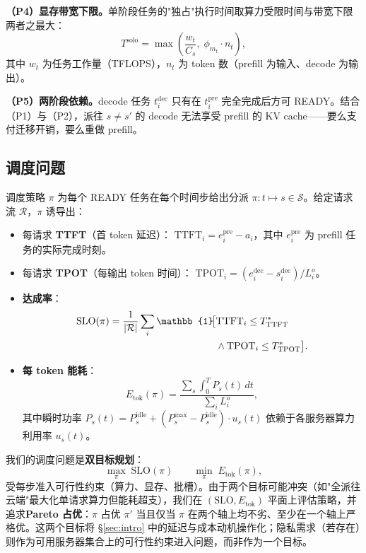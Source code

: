 \textbf{（P4）显存带宽下限。}单阶段任务的"独占"执行时间取算力受限时间与带宽下限两者之最大：
\begin{equation}
  T^{\text{solo}}
    = \max\!\left(\frac{w_t}{C_s},\;
                  \phi_{m_t} \cdot n_t\right),
\end{equation}
其中 $w_t$ 为任务工作量（TFLOPS），$n_t$ 为 token 数（prefill 为输入、decode 为输出）。

\textbf{（P5）两阶段依赖。}decode 任务 $t^{\text{dec}}_i$ 只有在 $t^{\text{pre}}_i$ 完全完成后方可 READY。结合（P1）与（P2），派往 $s \neq s'$ 的 decode 无法享受 prefill 的 KV cache——要么支付迁移开销，要么重做 prefill。

\subsection{调度问题}
\label{sec:sched-problem}

调度策略 $\pi$ 为每个 READY 任务在每个时间步给出分派 $\pi: t \mapsto s \in \mathcal{S}$。给定请求流 $\mathcal{R}$，$\pi$ 诱导出：

\begin{itemize}
\item 每请求 \textbf{TTFT}（首 token 延迟）：
  $\text{TTFT}_i = e^{\text{pre}}_i - a_i$，其中
  $e^{\text{pre}}_i$ 为 prefill 任务的实际完成时刻。

\item 每请求 \textbf{TPOT}（每输出 token 时间）：
  $\text{TPOT}_i = (e^{\text{dec}}_i - s^{\text{dec}}_i) / L^o_i$。

\item \textbf{\slo{} 达成率}：
  \begin{align}
    \text{SLO}(\pi) = \frac{1}{|\mathcal{R}|} \sum_i
      \mathbb{1}\!\bigl[&\text{TTFT}_i \le T^*_{\text{TTFT}}
      \notag\\
      &\land \text{TPOT}_i \le T^*_{\text{TPOT}}\bigr].
  \end{align}

\item \textbf{每 token 能耗}：
  \begin{equation}
    E_{\text{tok}}(\pi) =
      \frac{\sum_s \int_0^T P_s(t)\,dt}{\sum_i L^o_i},
  \end{equation}
  其中瞬时功率
  $P_s(t) = P^{\text{idle}}_s + (P^{\max}_s - P^{\text{idle}}_s)
  \cdot u_s(t)$ 依赖于各服务器算力利用率 $u_s(t)$。
\end{itemize}

我们的调度问题是\textbf{双目标规划}：
\begin{equation}
  \max_\pi\; \text{SLO}(\pi)
  \qquad
  \min_\pi\; E_{\text{tok}}(\pi),
\end{equation}
受每步准入可行性约束（算力、显存、批槽）。由于两个目标可能冲突（如"全派往云端"最大化单请求算力但能耗超支），我们在 $(\text{SLO}, E_{\text{tok}})$ 平面上评估策略，并追求\textbf{Pareto 占优}：$\pi$ 占优 $\pi'$ 当且仅当 $\pi$ 在两个轴上均不劣、至少在一个轴上严格优。这两个目标将 \S\ref{sec:intro} 中的延迟与成本动机操作化；隐私需求（若存在）则作为可用服务器集合上的可行性约束进入问题，而非作为一个目标。

